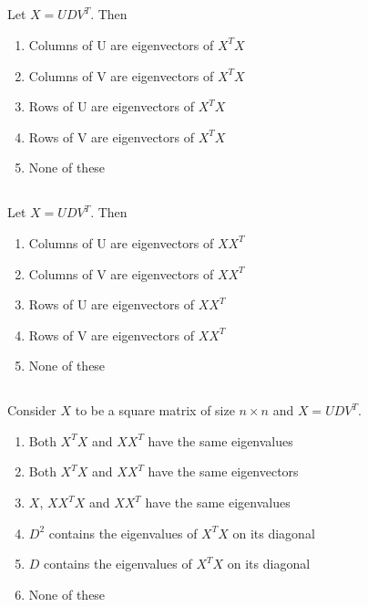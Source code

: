 \begin{frame}
\section{}
  Let $X=UDV^T$. Then
    \begin{enumerate}[label=(\Alph*)]
      \item Columns of U are eigenvectors of $X^TX$
          \item Columns of V are eigenvectors of $X^TX$   %
          \item Rows of U are eigenvectors of $X^TX$
          \item Rows of V are eigenvectors of $X^TX$
          \item None of these   %
    \end{enumerate}
\end{frame}

\begin{frame}
\section{}
  Let $X=UDV^T$. Then
     \begin{enumerate}[label=(\Alph*)]
       \item Columns of U are eigenvectors of $XX^T$    %
      \item Columns of V are eigenvectors of $XX^T$
      \item Rows of U are eigenvectors of $XX^T$
      \item Rows of V are eigenvectors of $XX^T$
      \item None of these   %
     \end{enumerate}
\end{frame}

\begin{frame}
\section{}
  Consider $X$ to be a square matrix of size $n\times n$ and $X=UDV^T$.
    \begin{enumerate}[label=(\Alph*)]
      \item Both $X^TX$ and $XX^T$ have the same eigenvalues    %
          \item Both $X^TX$ and $XX^T$ have the same eigenvectors
          \item $X$, $XX^TX$ and $XX^T$ have the same eigenvalues
          \item $D^2$ contains the eigenvalues of $X^TX$ on its diagonal  %
          \item $D$ contains the eigenvalues of $X^TX$ on its diagonal
          \item None of these   %
    \end{enumerate}
\end{frame}

